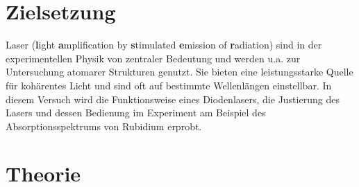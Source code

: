 \section{Zielsetzung}
\label{sec:Ziel}
Laser (\textbf{l}ight \textbf{a}mplification by \textbf{s}timulated \textbf{e}mission of \textbf{r}adiation) sind in der experimentellen Physik von zentraler Bedeutung
und werden u.a. zur Untersuchung atomarer Strukturen genutzt. Sie bieten eine leistungsstarke Quelle für kohärentes Licht und sind 
oft auf bestimmte Wellenlängen einstellbar. In diesem Versuch wird die Funktionsweise eines Diodenlasers, die Justierung des Lasers
und dessen Bedienung im Experiment am Beispiel des Absorptionsspektrums von Rubidium erprobt.


\section{Theorie}
\label{sec:Theorie}

